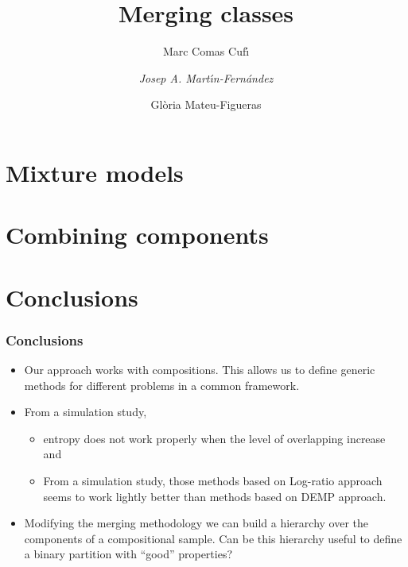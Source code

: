\documentclass[10pt]{beamer}
\title{Merging classes}
\author{Marc Comas Cuf\'{\i} \\ \and \emph{Josep A. Mart\'{\i}n-Fern\'{a}ndez} \\ \and Gl\`{o}ria Mateu-Figueras}
\date{}
\begin{document}
\begin{frame}
\titlepage
\end{frame}

\section{Mixture models}
\frame{\sectionpage}



\section{Combining components}
\frame{\sectionpage}





% 
% 

\section{Conclusions}
\begin{frame}
\frametitle{Conclusions}
\begin{itemize}
\item Our approach works with compositions. This allows us to define generic methods for different problems in a common framework.
\item From a simulation study, 
\begin{itemize}
\item entropy does not work properly when the level of overlapping increase and
\item From a simulation study, those methods based on Log-ratio approach seems to work lightly better than methods based on DEMP approach.
\end{itemize}
\item Modifying the merging methodology we can build a hierarchy over the components of a compositional sample. Can be this hierarchy useful to define a binary partition with ``good'' properties? 
\end{itemize}

\end{frame}

%
\end{document}
